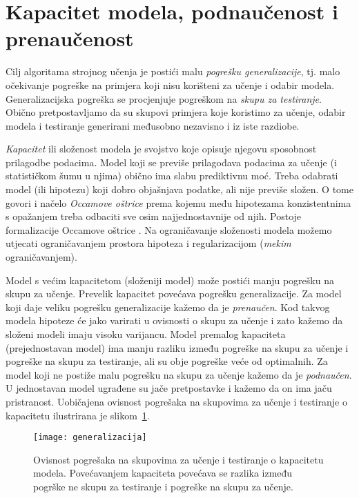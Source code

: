 \documentclass[utf8, diplomski, lmodern]{fer}
\begin{document}
\section{Kapacitet modela, podnaučenost i prenaučenost}

Cilj algoritama strojnog učenja je postići malu \emph{pogrešku generalizacije}, tj. malo očekivanje pogreške na primjera koji nisu korišteni za učenje i odabir modela. Generalizacijska pogreška se procjenjuje pogreškom na \emph{skupu za testiranje}. Obično pretpostavljamo da su skupovi primjera koje koristimo za učenje, odabir modela i testiranje generirani međusobno nezavisno i iz iste razdiobe.

\emph{Kapacitet} ili složenost modela je svojstvo koje opisuje njegovu sposobnost prilagodbe podacima. Model koji se previše prilagođava podacima za učenje (i statističkom šumu u njima) obično ima slabu prediktivnu moć. Treba odabrati model (ili hipotezu) koji dobro objašnjava podatke, ali nije previše složen. O tome govori i načelo \emph{Occamove oštrice} prema kojemu među hipotezama konzistentnima s opažanjem treba odbaciti sve osim najjednostavnije od njih. Postoje formalizacije Occamove oštrice \citep{Blumer:1987:OR,Blumer:1989:LVCD,Gruenwald:2005:TIMDL,Ratmanner:2011:PTUI}. Na ograničavanje složenosti modela možemo utjecati ograničavanjem prostora hipoteza i regularizacijom (\textit{mekim} ograničavanjem).

Model s većim kapacitetom (složeniji model) može postići manju pogrešku na skupu za učenje. Prevelik kapacitet povećava pogrešku generalizacije. Za model koji daje veliku pogrešku generalizacije kažemo da je \emph{prenaučen}. Kod takvog modela hipoteze će jako varirati u ovisnosti o skupu za učenje i zato kažemo da složeni modeli imaju visoku varijancu. Model premalog kapaciteta (prejednostavan model) ima manju razliku između pogreške na skupu za učenje i pogreške na skupu za testiranje, ali su obje pogreške veće od optimalnih. Za model koji ne postiže malu pogrešku na skupu za učenje kažemo da je \emph{podnaučen}. U jednostavan model ugrađene su jače pretpostavke i kažemo da on ima jaču pristranost. Uobičajena ovisnost pogrešaka na skupovima za učenje i testiranje o kapacitetu ilustrirana je slikom~\ref{fig:generalizacija}.

\begin{figure}
	\centering
	\texttt{[image: generalizacija]}
	\caption{Ovisnost pogrešaka na skupovima za učenje i testiranje o kapacitetu modela. Povećavanjem kapaciteta povećava se razlika između pogrške ne skupu za testiranje i pogreške na skupu za učenje.}
	\label{fig:generalizacija}
\end{figure}
\end{document}

